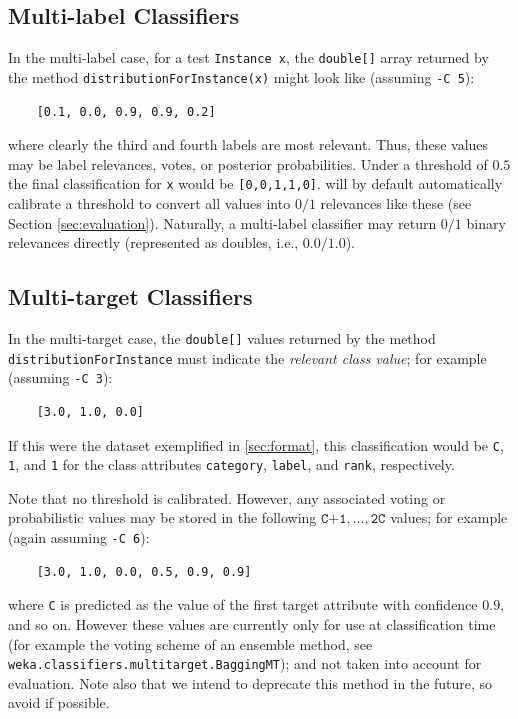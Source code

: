 \documentclass[11pt]{article}
\newcommand{\MEKA}{Meka}
\begin{document}
\subsection{Multi-label Classifiers}

In the multi-label case, for a test \texttt{Instance x}, the \texttt{double[]} array returned by the method \texttt{distributionForInstance(x)} might look like (assuming \texttt{-C 5}):
\begin{verbatim}
	[0.1, 0.0, 0.9, 0.9, 0.2]
\end{verbatim} 
where clearly the third and fourth labels are most relevant. Thus, these values may be label relevances, votes, or posterior probabilities. Under a threshold of $0.5$ the final classification for \texttt{x} would be \texttt{[0,0,1,1,0]}. \framework{\MEKA} will by default automatically calibrate a threshold to convert all values into $0/1$ relevances like these (see Section \ref{sec:evaluation}). Naturally, a multi-label classifier may return $0/1$ binary relevances directly (represented as doubles, i.e., $0.0/1.0$).

\subsection{Multi-target Classifiers}

In the multi-target case, the \texttt{double[]} values returned by the method \texttt{distributionForInstance} must indicate the \emph{relevant class value}; for example (assuming \texttt{-C 3}): 
\begin{verbatim}
	[3.0, 1.0, 0.0]
\end{verbatim} 
If this were the dataset exemplified in \ref{sec:format}, this classification would be \texttt{C}, \texttt{1}, and \texttt{1} for the class attributes \texttt{category}, \texttt{label}, and \texttt{rank}, respectively.

Note that no threshold is calibrated. However, any associated voting or probabilistic values may be stored in the following $\texttt{C+1},\ldots,\texttt{2C}$ values; for example (again assuming \texttt{-C 6}):
\begin{verbatim}
	[3.0, 1.0, 0.0, 0.5, 0.9, 0.9]
\end{verbatim} 
where \texttt{C} is predicted as the value of the first target attribute with confidence $0.9$, and so on. However these values are currently only for use at classification time (for example the voting scheme of an ensemble method, see \texttt{weka.classifiers.multitarget.BaggingMT}); and not taken into account for evaluation. Note also that we intend to deprecate this method in the future, so avoid if possible.
\end{document}
